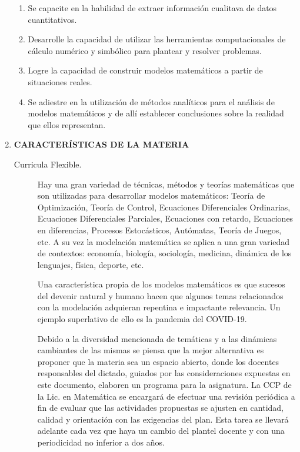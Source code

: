 \documentclass[12pt]{article}
\begin{document}
\begin{enumerate}
\begin{enumerate}
           \item\label{it:4} Se capacite en la habilidad de extraer información cualitava de datos cuantitativos.

           \item\label{it:5} Desarrolle la capacidad de utilizar las herramientas computacionales de cálculo numérico y simbólico para plantear y resolver problemas.
 
	    \item\label{it:6} Logre la capacidad  de construir  modelos matemáticos a partir de situaciones reales.

     
           \item\label{it:8} Se adiestre en la utilización de  métodos analíticos para el análisis de modelos matemáticos y de allí establecer conclusiones sobre la realidad que ellos representan.
           
    
        

          \end{enumerate}


\item \textbf{CARACTERÍSTICAS DE LA MATERIA}

\begin{description}
\item[Curricula Flexible.]  
		Hay una gran variedad de técnicas, métodos y teorías matemáticas que son utilizadas para desarrollar modelos matemáticos: Teoría de Optimización, Teoría de Control, Ecuaciones Diferenciales Ordinarias, Ecuaciones Diferenciales Parciales, Ecuaciones con retardo, Ecuaciones en diferencias, Procesos Estocásticos, Autómatas, Teoría de Juegos, etc. A su vez la modelación matemática se aplica a una gran variedad de contextos: economía, biología, sociología, medicina,  dinámica de los lenguajes, física, deporte, etc. 
		
		Una característica propia de los modelos matemáticos es que sucesos del devenir natural y humano hacen que algunos temas relacionados con la modelación  adquieran repentina e impactante relevancia. Un ejemplo superlativo de ello es la pandemia del COVID-19. 
		
		Debido a la diversidad mencionada de temáticas y a las dinámicas   cambiantes de las mismas se piensa que la mejor alternativa es proponer que la materia sea un espacio abierto, donde los docentes responsables del dictado, guiados por las  consideraciones expuestas en este documento, elaboren un programa para la asignatura. La CCP de la Lic. en Matemática se encargará de efectuar una revisión periódica a fin de evaluar que las actividades propuestas se ajusten en cantidad, calidad y orientación con las exigencias del plan. Esta tarea se llevará adelante cada vez que haya un cambio del plantel docente y  con una periodicidad no inferior a dos años.  
  

\end{description}
\end{enumerate}
\end{document}
